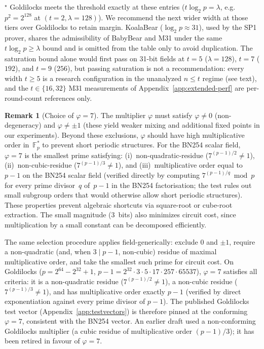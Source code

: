 \documentclass[11pt,a4paper]{article}
\theoremstyle{definition}
\newtheorem{remark}[theorem]{Remark}
\newcommand{\Fp}{\mathbb{F}_p}
\begin{document}
\begin{table}[!htbp]
\footnotesize
$^\star$ Goldilocks meets the threshold exactly at these entries
($t \log_2 p = \lambda$, e.g.\ $p^2 = 2^{128}$ at
$(t{=}2, \lambda{=}128)$). We recommend the next wider width at those
tiers over Goldilocks to retain margin. KoalaBear
($\log_2 p \approx 31$), used by the SP1 prover, shares the
admissibility of BabyBear and M31 under the same
$t\log_2 p \ge \lambda$ bound and is omitted from the table only to
avoid duplication. The saturation bound alone would first pass on
31-bit fields at $t = 5$ ($\lambda = 128$), $t = 7$ ($192$), and
$t = 9$ ($256$), but passing saturation is not a recommendation:
every width $t \ge 5$ is a research configuration in the unanalyzed
$n \le t$ regime (see text), and the $t \in \{16, 32\}$ M31
measurements of Appendix~\ref{app:extended-perf} are per-round-count
references only.
\end{table}

\FloatBarrier

\begin{remark}[Choice of $\varphi = 7$]\label{rem:phi7}
The multiplier $\varphi$ must satisfy $\varphi \neq 0$ (non-degeneracy)
and $\varphi \neq \pm 1$ (these yield weaker mixing and additional fixed
points in our experiments). Beyond these exclusions, $\varphi$ should
have high multiplicative order in~$\Fp^*$ to prevent short periodic
structures. For the BN254 scalar field, $\varphi = 7$ is the smallest
prime satisfying: (i)~non-quadratic-residue ($7^{(p-1)/2} \neq 1$),
(ii)~non-cubic-residue ($7^{(p-1)/3} \neq 1$), and
(iii)~multiplicative order equal to $p - 1$ on the BN254 scalar
field (verified directly by computing $7^{(p-1)/q} \bmod p$ for every
prime divisor~$q$ of~$p-1$ in the BN254 factorisation; the test rules
out small subgroup orders that would otherwise allow short periodic
structures).
These properties prevent algebraic shortcuts via square-root or
cube-root extraction. The small magnitude (3~bits) also minimizes
circuit cost, since multiplication by a small constant can be
decomposed efficiently.

The same selection procedure applies field-generically: exclude $0$
and $\pm 1$, require a non-quadratic (and, when $3 \mid p-1$,
non-cubic) residue of maximal multiplicative order, and take the
smallest such prime for circuit cost. On Goldilocks
($p = 2^{64} - 2^{32} + 1$, $p - 1 = 2^{32} \cdot 3 \cdot 5 \cdot
17 \cdot 257 \cdot 65537$), $\varphi = 7$ satisfies all criteria:
it is a non-quadratic residue ($7^{(p-1)/2} \neq 1$), a non-cubic
residue ($7^{(p-1)/3} \neq 1$), and has multiplicative order exactly
$p-1$ (verified by direct exponentiation against every prime divisor
of $p-1$). The published Goldilocks test vector
(Appendix~\ref{app:testvectors}) is therefore pinned at the
conforming $\varphi = 7$, consistent with the BN254 vector. An
earlier draft used a non-conforming Goldilocks multiplier (a cubic
residue of multiplicative order $(p-1)/3$); it has been retired in
favour of $\varphi = 7$.
\end{remark}
\end{document}

